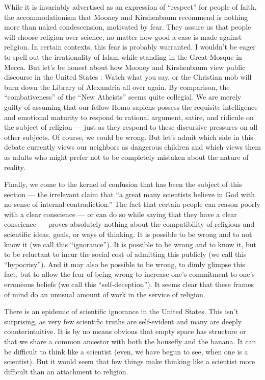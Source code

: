 \documentclass[a4paper,14pt]{extarticle}
\begin{document}
While it is invariably advertised as an expression of ``respect'' for people of faith, the accommodationism that Mooney and Kirshenbaum recommend is nothing more than naked condescension, motivated by fear.
They assure us that people will choose religion over science, no matter how good a case is made against religion.
In certain contexts, this fear is probably warranted.
I wouldn’t be eager to spell out the irrationality of Islam while standing in the Great Mosque in Mecca.
But let’s be honest about how Mooney and Kirshenbaum view public discourse in the United States :
Watch what you say, or the Christian mob will burn down the Library of Alexandria all over again.
By comparison, the ``combativeness'' of the ``New Atheists'' seems quite collegial.
We are merely guilty of assuming that our fellow Homo sapiens possess the requisite intelligence and emotional maturity to respond to rational argument, satire, and ridicule on the subject of religion --- just as they respond to these discursive pressures on all other subjects.
Of course, we could be wrong.
But let’s admit which side in this debate currently views our neighbors as dangerous children and which views them as adults who might prefer not to be completely mistaken about the nature of reality.

Finally, we come to the kernel of confusion that has been the subject of this section --- the irrelevant claim that ``a great many scientists believe in God with no sense of internal contradiction.''
The fact that certain people can reason poorly with a clear conscience --- or can do so while saying that they have a clear conscience --- proves absolutely nothing about the compatibility of religious and scientific ideas, goals, or ways of thinking.
It is possible to be wrong and to not know it (we call this ``ignorance'').
It is possible to be wrong and to know it, but to be reluctant to incur the social cost of admitting this publicly (we call this ``hypocrisy'').
And it may also be possible to be wrong, to dimly glimpse this fact, but to allow the fear of being wrong to increase one’s commitment to one’s erroneous beliefs (we call this ``self-deception'').
It seems clear that these frames of mind do an unusual amount of work in the service of religion.

There is an epidemic of scientific ignorance in the United States.
This isn’t surprising, as very few scientific truths are self-evident and many are deeply counterintuitive.
It is by no means obvious that empty space has structure or that we share a common ancestor with both the housefly and the banana.
It can be difficult to think like a scientist (even, we have begun to see, when one is a scientist).
But it would seem that few things make thinking like a scientist more difficult than an attachment to religion.
\end{document}
